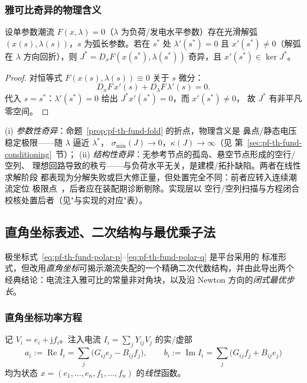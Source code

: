 \subsubsection{雅可比奇异的物理含义}

\begin{proposition}[鞍结折点处雅可比必奇异]\label{prop:pf-th-fund-fold}
设单参数潮流 $F(x,\lambda)=0$（$\lambda$ 为负荷/发电水平参数）存在光滑解弧
$(x(s),\lambda(s))$，$s$ 为弧长参数。若在 $s^*$ 处 $\lambda'(s^*)=0$ 且
$x'(s^*)\neq0$（解弧在 $\lambda$ 方向回折），则 $J^*=D_xF(x(s^*),\lambda(s^*))$
奇异，且 $x'(s^*)\in\ker J^*$。
\end{proposition}

\begin{proof}
对恒等式 $F(x(s),\lambda(s))\equiv0$ 关于 $s$ 微分：
\begin{equation}
D_xF\,x'(s)+D_\lambda F\,\lambda'(s)=0 .
\end{equation}
代入 $s=s^*$：$\lambda'(s^*)=0$ 给出 $J^*x'(s^*)=0$，而 $x'(s^*)\neq0$，
故 $J^*$ 有非平凡零空间。
\end{proof}

\begin{remark}[奇异的两类成因与工程区分]\label{rem:pf-th-fund-singularity}
(i) \emph{参数性奇异}：命题~\ref{prop:pf-th-fund-fold} 的折点，物理含义是
鼻点/静态电压稳定极限——随 $\lambda$ 逼近 $\lambda^*$，
$\sigma_{\min}(J)\to0$，$\kappa(J)\to\infty$（见
第~\ref{sec:pf-th-fund-conditioning}~节）；
(ii) \emph{结构性奇异}：无参考节点的孤岛、悬空节点形成的空行/空列、
理想回路导致的秩亏——与负荷水平无关，是建模/拓扑缺陷。两者在线性求解阶段
都表现为分解失败或巨大修正量，但处置完全不同：前者应转入连续潮流定位
极限点~\cite{pff:ajjarapu-christy}，后者应在装配期诊断剔除。实现层以
空行/空列扫描与方程闭合校核处置后者（见"与实现的对应"表）。
\end{remark}
\subsection{直角坐标表述、二次结构与最优乘子法}\label{sec:pf-th-fund-rect}

极坐标式~\eqref{eq:pf-th-fund-polar-p}--\eqref{eq:pf-th-fund-polar-q} 是平台采用的
标准形式，但改用\emph{直角坐标}可揭示潮流失配的一个精确二次代数结构，并由此导出两个
经典结论：电流注入雅可比的常量非对角块，以及沿 Newton 方向的\emph{闭式最优步长}。

\subsubsection{直角坐标功率方程}
\begin{definition}[直角坐标电压与注入电流]\label{def:pf-th-fund-rect}
记 $V_i=e_i+\mathrm jf_i$。注入电流 $I_i=\sum_jY_{ij}V_j$ 的实/虚部
\begin{equation}
a_i:=\operatorname{Re}I_i=\sum_j\bigl(G_{ij}e_j-B_{ij}f_j\bigr),\qquad
b_i:=\operatorname{Im}I_i=\sum_j\bigl(G_{ij}f_j+B_{ij}e_j\bigr)
\end{equation}
均为状态 $x=(e_1,\dots,e_n,f_1,\dots,f_n)$ 的\emph{线性}函数。
\end{definition}

